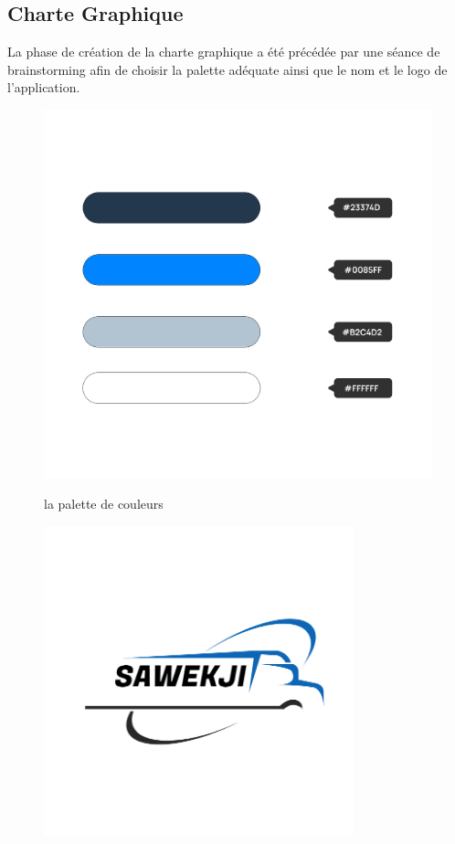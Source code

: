 
\newpage
\subsection{Charte Graphique}

La phase de création de la charte graphique a été précédée par une séance de brainstorming afin de choisir la palette adéquate ainsi que le nom et le logo de l’application.

\begin{figure}[h!]
  \centering
  \begin{minipage}[t]{0.45\textwidth}
    \centering
    \includegraphics[width=1\textwidth]{chap2.images/palette.png}
    \caption{la palette de couleurs}
  \end{minipage}
  \hfill
  \begin{minipage}[t]{0.45\textwidth}
    \centering
    \includegraphics[width=0.8\textwidth]{chap2.images/logo.png}
    \caption{}
  \end{minipage}
\end{figure}
